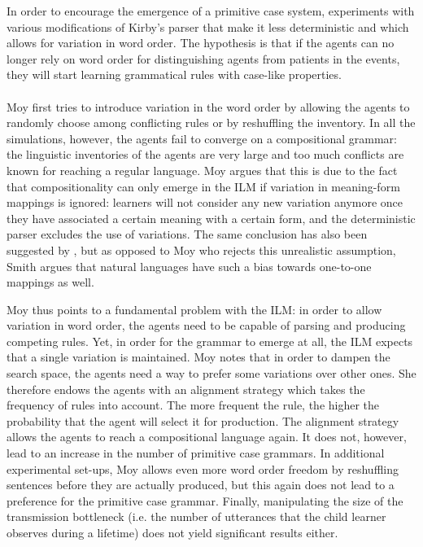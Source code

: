 In order to encourage the emergence of a primitive case system, \citet[chapter 5]{moy06case} experiments with various modifications of Kirby's parser that make it less deterministic and which allows for variation in word order. The hypothesis is that if the agents can no longer rely on word order for distinguishing agents from patients in the events, they will start learning grammatical rules with case-like properties.
\\
\\
 Moy first tries to introduce variation in the word order by allowing the agents to randomly choose among conflicting rules or by reshuffling the inventory. In all the simulations, however, the agents fail to converge on a compositional grammar: the linguistic inventories of the agents are very large and too much conflicts are known for reaching a regular language. Moy argues that this is due to the fact that compositionality can only emerge in the ILM if variation in meaning-form mappings is ignored: learners will not consider any new variation anymore once they have associated a certain meaning with a certain form, and the deterministic parser excludes the use of variations. The same conclusion has also been suggested by \citet{smith03transmission}, but as opposed to Moy who rejects this unrealistic assumption, Smith argues that natural languages have such a bias towards one-to-one mappings as well.

Moy thus points to a fundamental problem with the ILM: in order to allow variation in word order, the agents need to be capable of parsing and producing competing rules. Yet, in order for the grammar to emerge at all, the ILM expects that a single variation is maintained. Moy notes that in order to dampen the search space, the agents need a way to prefer some variations over other ones. She therefore endows the agents with an alignment strategy which takes the frequency of rules into account. The more frequent the rule, the higher the probability that the agent will select it for production. The alignment strategy allows the agents to reach a compositional language again. It does not, however, lead to an increase in the number of primitive case grammars. In additional experimental set-ups, Moy allows even more word order freedom by reshuffling sentences before they are actually produced, but this again does not lead to a preference for the primitive case grammar. Finally, manipulating the size of the transmission bottleneck (i.e. the number of utterances that the child learner observes during a lifetime) does not yield significant results either.

